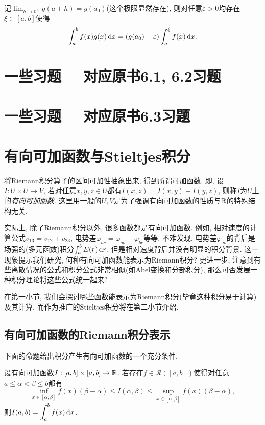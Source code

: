 记$\lim_{h \to 0^+}g(a+h) = g(a_0)$(这个极限显然存在), 则对任意$\varepsilon >0$均存在$\xi \in [a,b]$使得$$\int_a^bf(x)g(x) \mathop{}\!\mathrm{d} x = (g(a_0)+\varepsilon) \int_a^{\xi} f(x) \mathop{}\!\mathrm{d} x.$$

\newpage
\section*{一些习题 ~~\small 对应原书6.1, 6.2习题} \label{sec:ex7.1}

\newpage
\section*{一些习题 ~~\small 对应原书6.3习题} \label{sec:ex7.2}

\newpage
\section{有向可加函数与Stieltjes积分}

将Riemann积分算子的区间可加性抽象出来, 得到所谓可加函数. 即, 设$I:U \times U \to V$, 若对任意$x,y,z \in U$都有$I(x,z)=I(x,y)+I(y,z)$, 则称$I$为$U$上的\textit{有向可加函数}. 这里用一般的$U,V$是为了强调有向可加函数的性质与$\mathbb{R}$的特殊结构无关. 

实际上, 除了Riemann积分以外, 很多函数都是有向可加函数. 例如, 相对速度的计算公式$v_{13}=v_{12}+v_{23}$, 电势差$\varphi _{ac}=\varphi _{ab}+\varphi _{bc}$等等. 不难发现, 电势差$\varphi _{ab}$的背后是场强的(多元函数)积分$\int_a^b E(r) \mathop{}\!\mathrm{d} r$, 但是相对速度背后并没有明显的积分背景. 这一现象提示我们研究, 何种有向可加函数能表示为Riemann积分? 更进一步, 注意到有些离散情况的公式和积分公式非常相似(如Abel变换和分部积分), 那么可否发展一种积分理论将这些公式统一起来? 

在第一小节, 我们会探讨哪些函数能表示为Riemann积分(毕竟这种积分易于计算)及其计算. 而作为推广的Stieltjes积分将在第二小节介绍. 

\subsection{有向可加函数的Riemann积分表示}

下面的命题给出积分产生有向可加函数的一个充分条件. 

\begin{proposition}{}
	设有向可加函数$I:[a,b] \times [a,b] \to \mathbb{R}$. 若存在$f \in \mathcal{R}([a,b])$使得对任意$a \leq \alpha < \beta \leq b$都有$$\inf_{x\in [\alpha ,\beta]} f(x) (\beta -\alpha) \leq I(\alpha ,\beta) \leq \sup_{x\in [\alpha ,\beta]} f(x) (\beta -\alpha),$$
	则$\displaystyle I(a,b)=\int_a^b f(x) \mathop{}\!\mathrm{d} x$. 
\end{proposition}

